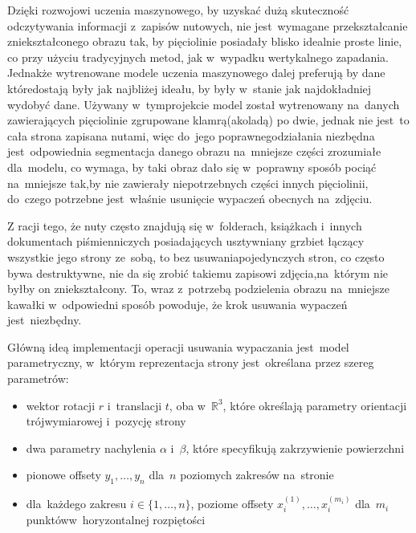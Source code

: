 Dzięki rozwojowi uczenia maszynowego, by uzyskać dużą skuteczność odczytywania informacji z~zapisów nutowych, nie jest~wymagane przekształcanie zniekształconego obrazu tak, by pięciolinie posiadały blisko idealnie proste linie, co przy użyciu tradycyjnych metod, jak w~wypadku wertykalnego zapadania. Jednakże wytrenowane modele uczenia maszynowego dalej preferują by dane które\linebreak dostają były jak najbliżej ideału, by były w~stanie jak najdokładniej wydobyć dane. Używany w~tym\linebreak projekcie model został wytrenowany na~danych zawierających pięciolinie zgrupowane klamrą\linebreak (akoladą) po dwie, jednak nie jest~to cała strona zapisana nutami, więc do~jego poprawnego\linebreak działania niezbędna jest~odpowiednia segmentacja danego obrazu na~mniejsze części zrozumiałe dla~modelu, co wymaga, by taki obraz dało się w~poprawny sposób pociąć na~mniejsze tak,\linebreak by nie zawierały niepotrzebnych części innych pięciolinii, do~czego potrzebne jest~właśnie usunięcie wypaczeń obecnych na~zdjęciu.

Z racji tego, że nuty często znajdują się w~folderach, książkach i~innych dokumentach piśmienniczych posiadających usztywniany grzbiet łączący wszystkie jego strony ze~sobą, to bez usuwania\linebreak pojedynczych stron, co często bywa destruktywne, nie da się zrobić takiemu zapisowi zdjęcia,\linebreak na~którym nie byłby on zniekształcony. To, wraz z~potrzebą podzielenia obrazu na~mniejsze kawałki w~odpowiedni sposób powoduje, że krok usuwania wypaczeń jest~niezbędny.

Główną ideą implementacji operacji usuwania wypaczania jest~model parametryczny, w~którym reprezentacja strony jest~określana przez szereg parametrów:

\begin{itemize}
	\item wektor rotacji $r$ i~translacji $t$, oba w~$\mathbb{R}^{3}$, które określają parametry orientacji trójwymiarowej i~pozycję strony
	\item dwa parametry nachylenia $\alpha$ i~$\beta$, które specyfikują zakrzywienie powierzchni
	\item pionowe offsety $y_{1},\ldots,y_{n}$ dla~$n$ poziomych zakresów na~stronie
	\item dla~każdego zakresu $i \in \{1,\ldots,n\}$, poziome offsety $x_{i}^{(1)},\ldots,x_{i}^{(m_{i})}$ dla~$m_{i}$ punktów\linebreak w~horyzontalnej rozpiętości
\end{itemize} 

